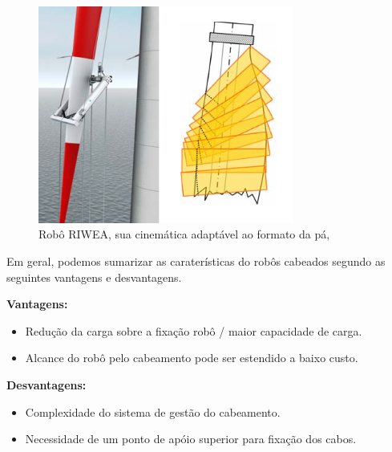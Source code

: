 \begin{figure}[!h]
	\centering
	\includegraphics[width=8.4cm]{figs/cables/riwea}
	\caption{Robô RIWEA, sua cinemática adaptável ao formato da pá, \cite{riwea}}
	\label{fig:cables:riwea}
\end{figure}

Em geral, podemos sumarizar as caraterísticas do robôs cabeados segundo as
seguintes vantagens e desvantagens.

\textbf{Vantagens:}
\begin{itemize}
  \item Redução da carga sobre a fixação robô / maior capacidade de carga.
  \item Alcance do robô pelo cabeamento pode ser estendido a baixo custo.  
\end{itemize}

\textbf{Desvantagens:}
\begin{itemize}
  \item Complexidade do sistema de gestão do cabeamento.
  \item Necessidade de um ponto de apóio superior para fixação dos cabos.
\end{itemize}


